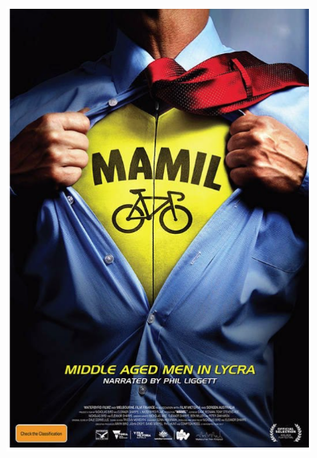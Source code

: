 \documentclass[10pt]{beamer}
\begin{document}
\begin{frame}
	\begin{columns}
		\begin{column}{0.6\textwidth}
			\begin{center}
				\includegraphics[width=0.75\textwidth]{figures/mamil.png}
			\end{center}
		\end{column}
		

\end{columns}
\end{frame}
\end{document}
